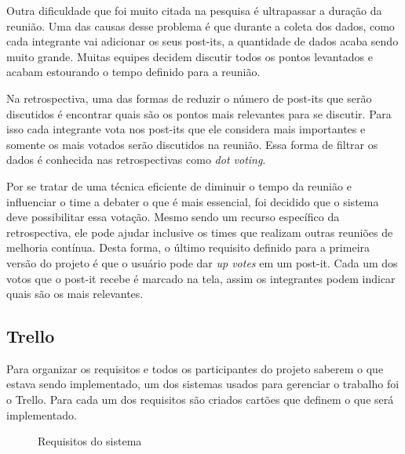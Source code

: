 Outra dificuldade que foi muito citada na pesquisa é ultrapassar a duração da reunião. Uma das causas desse problema é que durante a coleta dos dados, como cada integrante vai adicionar os seus post-its, a quantidade de dados acaba sendo muito grande. Muitas equipes decidem discutir todos os pontos levantados e acabam estourando o tempo definido para a reunião.

Na retrospectiva, uma das formas de reduzir o número de post-its que serão discutidos é encontrar quais são os pontos mais relevantes para se discutir. Para isso cada integrante vota nos post-its que ele considera mais importantes e somente os mais votados serão discutidos na reunião. Essa forma de filtrar os dados é conhecida nas retrospectivas como \textit{dot voting}.

Por se tratar de uma técnica eficiente de diminuir o tempo da reunião e influenciar o time a debater o que é mais essencial, foi decidido que o sistema deve possibilitar essa votação. Mesmo sendo um recurso específico da retrospectiva, ele pode ajudar inclusive os times que realizam outras reuniões de melhoria contínua. Desta forma, o último requisito definido para a primeira versão do projeto é que o usuário pode dar \textit{up votes} em um post-it. Cada um dos votos que o post-it recebe é marcado na tela, assim os integrantes podem indicar quais são os mais relevantes.

\subsection{Trello}

Para organizar os requisitos e todos os participantes do projeto saberem o que estava sendo implementado, um dos sistemas usados para gerenciar o trabalho foi o Trello. Para cada um dos requisitos são criados cartões que definem o que será implementado.

\begin{figure}[H]
  \hspace*{-4em}
  \caption{Requisitos do sistema}\label{figura:requisitos}
\end{figure}

